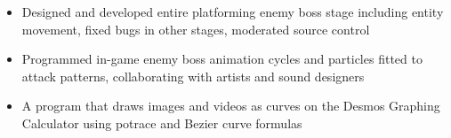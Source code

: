 
\begin{itemize}
\item Designed and developed entire platforming enemy boss stage including entity movement, fixed bugs in other stages, moderated source control

\item Programmed in-game enemy boss animation cycles and particles fitted to attack patterns, collaborating with artists and sound designers

\end{itemize}

\divider

\begin{itemize}
\item A program that draws images and videos as curves on the Desmos Graphing Calculator using potrace and Bezier curve formulas
\end{itemize}


